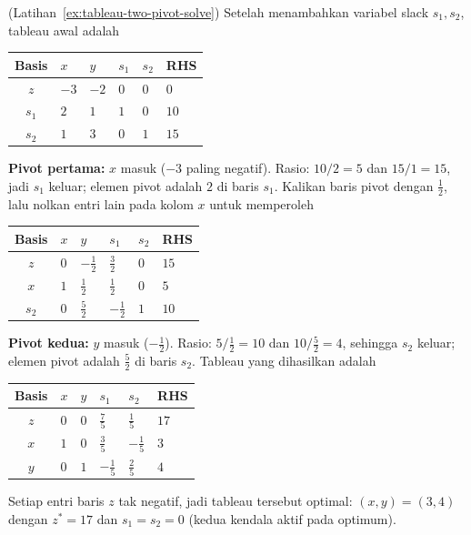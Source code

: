 \begin{solution}(Latihan~\ref{ex:tableau-two-pivot-solve})
Setelah menambahkan variabel slack $s_1, s_2$, tableau awal adalah
\begin{center}
\renewcommand{\arraystretch}{1.3}
\begin{tabular}{c|ZZZZ|Z}
\toprule
Basis & $x$ & $y$ & $s_1$ & $s_2$ & RHS\\
\midrule
$z$   & $-3$ & $-2$ & $0$ & $0$ & $0$\\
\midrule
$s_1$ & $2$ & $1$ & $1$ & $0$ & $10$\\
$s_2$ & $1$ & $3$ & $0$ & $1$ & $15$\\
\bottomrule
\end{tabular}
\end{center}

\textbf{Pivot pertama: } $x$ masuk ($-3$ paling negatif). Rasio: $10/2 = 5$ dan $15/1 = 15$, jadi $s_1$ keluar; elemen pivot adalah $2$ di baris $s_1$. Kalikan baris pivot dengan $\tfrac12$, lalu nolkan entri lain pada kolom $x$ untuk memperoleh
\begin{center}
\renewcommand{\arraystretch}{1.3}
\begin{tabular}{c|ZZZZ|Z}
\toprule
Basis & $x$ & $y$ & $s_1$ & $s_2$ & RHS\\
\midrule
$z$   & $0$ & $-\tfrac12$ & $\tfrac32$ & $0$ & $15$\\
\midrule
$x$   & $1$ & $\tfrac12$ & $\tfrac12$ & $0$ & $5$\\
$s_2$ & $0$ & $\tfrac52$ & $-\tfrac12$ & $1$ & $10$\\
\bottomrule
\end{tabular}
\end{center}

\textbf{Pivot kedua:} $y$ masuk ($-\tfrac12$). Rasio: $5/\tfrac12 = 10$ dan $10/\tfrac52 = 4$, sehingga $s_2$ keluar; elemen pivot adalah $\tfrac52$ di baris $s_2$. Tableau yang dihasilkan adalah
\begin{center}
\renewcommand{\arraystretch}{1.3}
\begin{tabular}{c|ZZZZ|Z}
\toprule
Basis & $x$ & $y$ & $s_1$ & $s_2$ & RHS\\
\midrule
$z$   & $0$ & $0$ & $\tfrac75$ & $\tfrac15$ & $17$\\
\midrule
$x$ & $1$ & $0$ & $\tfrac35$ & $-\tfrac15$ & $3$\\
$y$ & $0$ & $1$ & $-\tfrac15$ & $\tfrac25$ & $4$\\
\bottomrule
\end{tabular}
\end{center}
Setiap entri baris $z$ tak negatif, jadi tableau tersebut optimal: $(x, y) = (3, 4)$ dengan $z^* = 17$ dan $s_1 = s_2 = 0$ (kedua kendala aktif pada optimum).
\end{solution}
